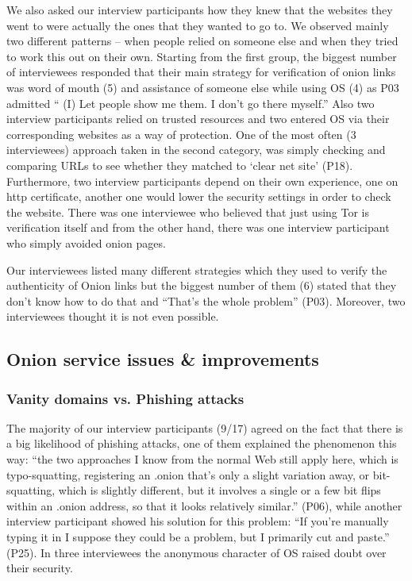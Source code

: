 We also asked our interview participants how they knew that the websites they went to were actually the ones that they wanted to go to.  We observed mainly two different patterns – when people relied on someone else and when they tried to work this out on their own. Starting from the first group, the biggest number of interviewees responded that their main strategy for verification of onion links was word of mouth (5) and assistance of someone else while using OS (4) as P03 admitted “ (I) Let people show me them. I don't go there myself.” Also two interview participants relied on trusted resources and two entered OS via their corresponding websites as a way of protection. One of the most often (3 interviewees) approach taken in the second category, was simply checking and comparing URLs to see whether they matched to ‘clear net site’ (P18). Furthermore, two interview participants depend on their own experience, one on http certificate, another one would lower the security settings in order to check the website. There was one interviewee who believed that just using Tor is verification itself and from the other hand, there was one interview participant who simply avoided onion pages.

Our interviewees listed many different strategies which they used to verify the authenticity of Onion links but the biggest number of them (6) stated that they don’t know how to do that and “That’s the whole problem” (P03). Moreover, two interviewees thought it is not even possible.


\subsection{Onion service issues \& improvements}
\label{sec:improve}

\subsubsection{Vanity domains vs. Phishing attacks}
The majority of our interview participants (9/17) agreed on the fact that there is a big likelihood of phishing attacks, one of them explained the phenomenon this way: ``the two approaches I know from the normal Web still apply here, which is typo-squatting, registering an .onion that's only a slight variation away, or bit-squatting, which is slightly different, but it involves a single or a few bit flips within an .onion address, so that it looks relatively similar.'' (P06), while another interview participant showed his solution for this problem: ``If you're manually typing it in I suppose they could be a problem, but I primarily cut and paste.'' (P25). In three interviewees the anonymous character of OS raised doubt over their security.

